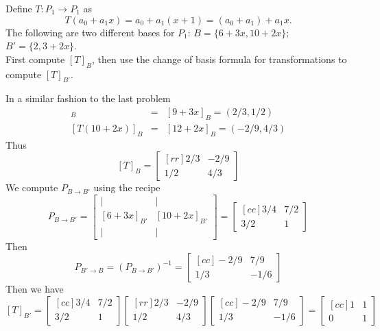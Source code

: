 \ii Define $T\colon P_1\rightarrow P_1$ as 
$$
T(a_0 +a_1x) = a_0 +a_1(x+1) = (a_0 +a_1) +a_1x.
$$
The following are two different bases for $P_1$: $B = \{6+3x, 10+2x\}$; $B' = \{2,3+2x\}$.
\\
First compute $[T]_B$, then use the change of basis formula for transformations to compute $[T]_{B'}$. 
\\
\begin{solution}
\noindent In a similar fashion to the last problem
\begin{eqnarray*}
 [T(6+3x)]_B &=& [9+3x]_B=(2/3, 1/2) \\
 \left[T(10+2x)\right]_B &=& [12 +2x]_B=(-2/9,4/3)
\end{eqnarray*}
Thus
$$
[T]_B =
\begin{bmatrix}[rr]
2/3&-2/9\\
1/2&4/3
\end{bmatrix}
$$
We compute $P_{B\rightarrow B'}$ using the recipe
$$
P_{B\rightarrow B'} =\begin{bmatrix}
\vert&\vert \\
[6+3x]_{B'}&[10+2x]_{B'}\\
\vert&\vert
\end{bmatrix}
=
\begin{bmatrix}[cc]
3/4&7/2\\
3/2&1
\end{bmatrix}
$$
Then 
$$P_{B'\rightarrow B}=(P_{B\rightarrow B'})^{-1}=
\begin{bmatrix}[cc]
-2/9&7/9\\
1/3&-1/6
\end{bmatrix}
$$
Then we have 
$$
[T]_{B'} =
\begin{bmatrix}[cc]
3/4&7/2\\
3/2&1
\end{bmatrix}
\begin{bmatrix}[rr]
2/3&-2/9\\
1/2&4/3
\end{bmatrix}
\begin{bmatrix}[cc]
-2/9&7/9\\
1/3&-1/6
\end{bmatrix}
=
\begin{bmatrix}[cc]
1&1\\
0&1
\end{bmatrix}
$$
\end{solution}

